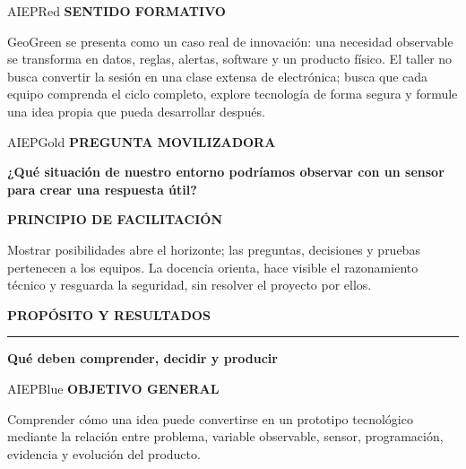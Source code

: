 \documentclass[10pt,a4paper]{article}
\newcommand{\kicker}[1]{%
  {\color{AIEPRed}\scriptsize\bfseries\MakeUppercase{#1}}\par\vspace{2.5mm}
  {\color{AIEPRed}\rule{13mm}{1.2pt}}\vspace{3mm}
}
\newcommand{\labeltext}[1]{%
  {\scriptsize\bfseries\color{AIEPSlate}\MakeUppercase{#1}}\par\vspace{1.2mm}
}
\begin{document}
\begin{softcard}{AIEPRed}
\labeltext{Sentido formativo}
GeoGreen se presenta como un caso real de innovación: una necesidad observable se transforma en
datos, reglas, alertas, software y un producto físico. El taller no busca convertir la sesión en una
clase extensa de electrónica; busca que cada equipo comprenda el ciclo completo, explore tecnología
de forma segura y formule una idea propia que pueda desarrollar después.
\end{softcard}

\begin{softcard}{AIEPGold}
\labeltext{Pregunta movilizadora}
{\large\bfseries\color{AIEPNavy}¿Qué situación de nuestro entorno podríamos observar con un sensor para crear una respuesta útil?}
\end{softcard}

\begin{card}
\labeltext{Principio de facilitación}
Mostrar posibilidades abre el horizonte; las preguntas, decisiones y pruebas pertenecen a los
equipos. La docencia orienta, hace visible el razonamiento técnico y resguarda la seguridad, sin
resolver el proyecto por ellos.
\end{card}

\newpage
\kicker{Propósito y resultados}
{\LARGE\bfseries\color{AIEPNavy}Qué deben comprender, decidir y producir}\par
\vspace{4mm}

\begin{softcard}{AIEPBlue}
\labeltext{Objetivo general}
Comprender cómo una idea puede convertirse en un prototipo tecnológico mediante la relación entre
problema, variable observable, sensor, programación, evidencia y evolución del producto.
\end{softcard}
\end{document}
